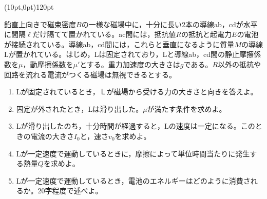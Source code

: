 \hakosyokika
\item
    \begin{mawarikomi}(10pt,0pt){120pt}{
        
    }
    鉛直上向きで磁束密度$B$の一様な磁場中に，十分に長い2本の導線ab，cdが水平に間隔$\ell$だけ隔てて置かれている。ac間には，抵抗値$R$の抵抗と起電力$E$の電池が接続されている。導線ab，cd間には，これらと垂直になるように質量$M$の導線Lが置かれている。はじめ，Lは固定されており，Lと導線ab，cd間の静止摩擦係数を$\mu $，動摩擦係数を$\mu '$とする。重力加速度の大きさは$g$である。$R$以外の抵抗や回路を流れる電流がつくる磁場は無視できるとする。
        \begin{enumerate}
            \item Lが固定されているとき，Ｌが磁場から受ける力の大きさと向きを答えよ。
            \item 固定が外されたとき，Lは滑り出した。$\mu $が満たす条件を求めよ。
            \item Lが滑り出したのち，十分時間が経過すると，Lの速度は一定になる。このときの電流の大きさ$I_0$と，速さ$v_0$を求めよ。
            \item Lが一定速度で運動しているときに，摩擦によって単位時間当たりに発生する熱量$Q$を求めよ。
            \item Lが一定速度で運動しているとき，電池のエネルギーはどのように消費されるか。20字程度で述べよ。
        \end{enumerate}
    \end{mawarikomi}